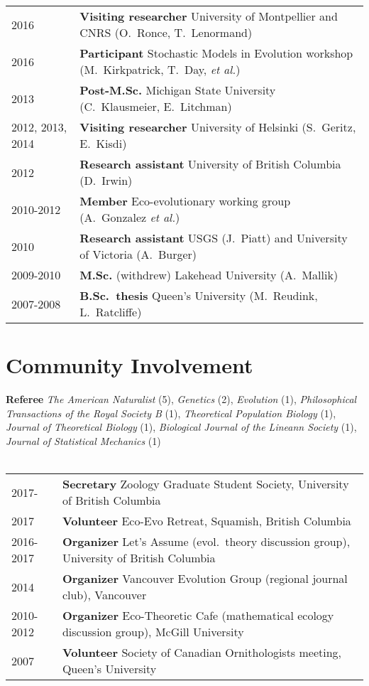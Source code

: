 \documentclass[12pt]{article}
\begin{document}
\begin{tabular}{ll}
2016 & \textbf{Visiting researcher} University of Montpellier and CNRS (O.\ Ronce, T.\ Lenormand)\\ 
2016 & \textbf{Participant} Stochastic Models in Evolution workshop (M.\ Kirkpatrick, T.\ Day, \textit{et al.}) \\
2013 &  \textbf{Post-M.Sc.} Michigan State University (C.\ Klausmeier, E.\ Litchman)\\
2012, 2013, 2014 &  \textbf{Visiting researcher} University of Helsinki (S.\ Geritz, E.\ Kisdi)\\ 
2012 &  \textbf{Research assistant} University of British Columbia (D.\ Irwin)\\
2010-2012 &  \textbf{Member} Eco-evolutionary working group (A.\ Gonzalez \textit{et al.})\\
2010 & \textbf{Research assistant} USGS (J.\ Piatt) and University of Victoria (A.\ Burger) \\
2009-2010 & \textbf{M.Sc.} (withdrew) Lakehead University (A.\ Mallik) \\
2007-2008 & \textbf{B.Sc.\ thesis} Queen's University (M.\ Reudink, L.\ Ratcliffe)
\end{tabular}


\section*{Community Involvement}

\noindent \textbf{Referee} \textit{The American Naturalist} (5), \textit{Genetics} (2), \textit{Evolution} (1), \textit{Philosophical Transactions of the Royal Society B} (1), \textit{Theoretical Population Biology} (1), \textit{Journal of Theoretical Biology} (1), \textit{Biological Journal of the Lineann Society} (1), \textit{Journal of Statistical Mechanics} (1)\\ 
\\
\begin{tabular}{ll}
2017- & \textbf{Secretary} Zoology Graduate Student Society, University of British Columbia \\
2017 & \textbf{Volunteer} Eco-Evo Retreat, Squamish, British Columbia \\
2016-2017 & \textbf{Organizer} Let's Assume (evol.\ theory discussion group), University of British Columbia \\
2014 & \textbf{Organizer} Vancouver Evolution Group (regional journal club), Vancouver \\
2010-2012 & \textbf{Organizer} Eco-Theoretic Cafe (mathematical ecology discussion group), McGill University \\
2007 & \textbf{Volunteer} Society of Canadian Ornithologists meeting,  Queen's University
\end{tabular}
\end{document}
